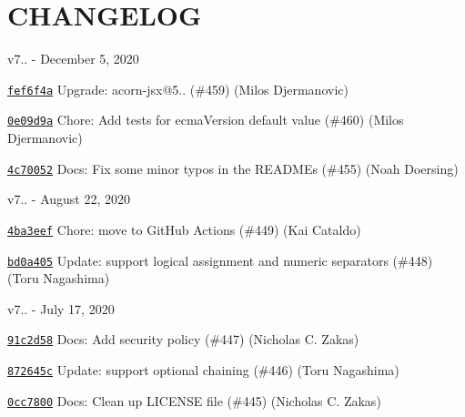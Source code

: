 \chapter{CHANGELOG}
\hypertarget{md__c_1_2_users_2_s_t_r_i_d_e_r_2source_2repos_2_ainslie_a_p_i_2wwwroot_2lib_2jquery-ui_2node__mae27d3b114185bdf63a769adad782f78}{}\label{md__c_1_2_users_2_s_t_r_i_d_e_r_2source_2repos_2_ainslie_a_p_i_2wwwroot_2lib_2jquery-ui_2node__mae27d3b114185bdf63a769adad782f78}
v7.. -\/ December 5, 2020


\begin{DoxyItemize}
\item \href{https://github.com/eslint/espree/commit/fef6f4a2803d959304c6961527044bd9da39ac92}{\texttt{ {\ttfamily fef6f4a}}} Upgrade\+: acorn-\/jsx@5.. (\#459) (Milos Djermanovic)
\item \href{https://github.com/eslint/espree/commit/0e09d9a4f213cb87073a6a87cb7d6317b77d1a23}{\texttt{ {\ttfamily 0e09d9a}}} Chore\+: Add tests for ecma\+Version default value (\#460) (Milos Djermanovic)
\item \href{https://github.com/eslint/espree/commit/4c70052df0b0ba903602c1f838918cbc07ee5eca}{\texttt{ {\ttfamily 4c70052}}} Docs\+: Fix some minor typos in the READMEs (\#455) (Noah Doersing)
\end{DoxyItemize}

v7.. -\/ August 22, 2020


\begin{DoxyItemize}
\item \href{https://github.com/eslint/espree/commit/4ba3eefdc4b32784565822b34f11977e99ca1a19}{\texttt{ {\ttfamily 4ba3eef}}} Chore\+: move to Git\+Hub Actions (\#449) (Kai Cataldo)
\item \href{https://github.com/eslint/espree/commit/bd0a405ffbe4962bcf5aa225ed3861a6a15cb827}{\texttt{ {\ttfamily bd0a405}}} Update\+: support logical assignment and numeric separators (\#448) (Toru Nagashima)
\end{DoxyItemize}

v7.. -\/ July 17, 2020


\begin{DoxyItemize}
\item \href{https://github.com/eslint/espree/commit/91c2d5896889042058399cd64de4b218c5add0eb}{\texttt{ {\ttfamily 91c2d58}}} Docs\+: Add security policy (\#447) (Nicholas C. Zakas)
\item \href{https://github.com/eslint/espree/commit/872645cea0bee08960b93c097f84153d44b44d7f}{\texttt{ {\ttfamily 872645c}}} Update\+: support optional chaining (\#446) (Toru Nagashima)
\item \href{https://github.com/eslint/espree/commit/0cc78007c933564f32fd849bd8022992845c3ac1}{\texttt{ {\ttfamily 0cc7800}}} Docs\+: Clean up LICENSE file (\#445) (Nicholas C. Zakas)
\end{DoxyItemize}

